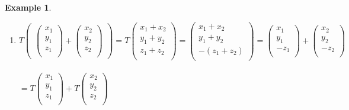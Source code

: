 \documentclass[11pt,a4paper]{article}
\theoremstyle{definition}
\newtheorem{exa}[thm]{Example}
\begin{document}
\begin{exa}
\begin{enumerate}
\begin{enumerate}
\item[(i)] $T \begin{pmatrix}
\begin{pmatrix}
x_1\\
y_1\\
z_1\\
\end{pmatrix} + \begin{pmatrix}
x_2\\
y_2\\
z_2\\
\end{pmatrix}
\end{pmatrix}  = T \begin{pmatrix}
x_1 + x_2\\
y_1 + y_2\\
z_1 + z_2\\
\end{pmatrix} = \begin{pmatrix}
x_1 + x_2\\
y_1 + y_2\\
-(z_1 + z_2)\\
\end{pmatrix}  = \begin{pmatrix}
x_1\\
y_1\\
-z_1\\
\end{pmatrix} + \begin{pmatrix}
x_2\\
y_2\\
-z_2\\
\end{pmatrix}$\\\\

$ = T\begin{pmatrix}
x_1\\
y_1\\
z_1\\
\end{pmatrix} +  T\begin{pmatrix}
x_2\\
y_2\\
z_2\\
\end{pmatrix}$\\\\


\end{enumerate}
\end{enumerate}
\end{exa}
\end{document}

